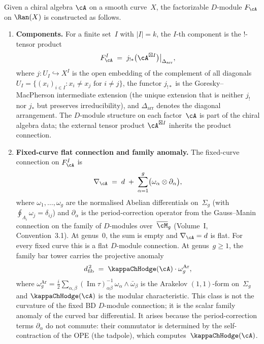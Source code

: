 \begin{construction}
\label{constr:fact-dmod-from-chiral}
Given a chiral algebra $\cA$ on a smooth curve~$X$, the
factorizable $D$-module $F_\cA$ on $\Ran(X)$ is constructed as follows.
\begin{enumerate}[label=\textup{(\roman*)}]
\item \textbf{Components.} For a finite set~$I$ with $|I| = k$, the
 $I$\nobreakdash-th component is the $!$-tensor product
 \begin{equation}\label{eq:!-tensor-component}
 F_\cA^I
 \;=\;
 j_{!*}\bigl(\cA^{\boxtimes I}\bigr)
 \big|_{\Delta_{\mathrm{arr}}},
 \end{equation}
 where $j\colon U_I \hookrightarrow X^I$ is the open embedding of
 the complement of all diagonals
 $U_I = \{(x_i)_{i \in I} : x_i \neq x_j \text{ for } i \neq j\}$,
 the functor $j_{!*}$ is the Goresky--MacPherson intermediate extension
 (the unique extension that is neither $j_!$ nor $j_*$ but preserves
 irreducibility), and $\Delta_{\mathrm{arr}}$ denotes the diagonal
 arrangement. The $D$-module structure on each factor~$\cA$ is
 part of the chiral algebra data; the external tensor product
 $\cA^{\boxtimes I}$ inherits the product connection.

\item \textbf{Fixed-curve flat connection and family anomaly.}
 The fixed-curve connection on $F_\cA^I$ is
 \begin{equation}\label{eq:fact-connection}
 \nabla_\cA
 \;=\;
 d \;+\;
 \sum_{\alpha=1}^g
 \bigl(\omega_\alpha \otimes \partial_\alpha\bigr),
 \end{equation}
 where $\omega_1,\ldots,\omega_g$ are the normalised Abelian
 differentials on~$\Sigma_g$ (with $\oint_{A_i}\omega_j = \delta_{ij}$)
 and $\partial_\alpha$ is the period-correction operator from the
 Gauss--Manin connection on the family of $D$-modules over~$\Mbar_g$
 (Volume~I, Convention~3.1). At genus~$0$, the sum is empty and
 $\nabla_\cA = d$ is flat. For every fixed curve this is a flat
 $D$-module connection. At genus~$g \geq 1$, the family bar tower
 carries the projective anomaly
 \begin{equation}\label{eq:connection-curvature}
 \dfib^{\,2}
 \;=\;
 \kappaChHodge(\cA) \cdot \omega_g^{\mathrm{Ar}},
 \end{equation}
 where $\omega_g^{\mathrm{Ar}} = \frac{i}{2}\sum_{\alpha,\beta}
 (\operatorname{Im}\tau)^{-1}_{\alpha\beta}\,
 \omega_\alpha \wedge \bar\omega_\beta$ is the Arakelov
 $(1,1)$-form on~$\Sigma_g$ and $\kappaChHodge(\cA)$ is the modular
 characteristic. This class is not the curvature of the fixed
 BD $D$-module connection; it is the scalar family anomaly of the
 curved bar differential. It arises because the
 period-correction terms $\partial_\alpha$ do not commute:
 their commutator is determined by the self-contraction of the
 OPE (the tadpole), which computes~$\kappaChHodge(\cA)$.


\end{enumerate}
\end{construction}
